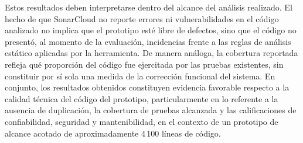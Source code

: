 Estos resultados deben interpretarse dentro del alcance del análisis realizado. El hecho de que SonarCloud no reporte errores ni vulnerabilidades en el código analizado no implica que el prototipo esté libre de defectos, sino que el código no presentó, al momento de la evaluación, incidencias frente a las reglas de análisis estático aplicadas por la herramienta. De manera análoga, la cobertura reportada refleja qué proporción del código fue ejercitada por las pruebas existentes, sin constituir por sí sola una medida de la corrección funcional del sistema. En conjunto, los resultados obtenidos constituyen evidencia favorable respecto a la calidad técnica del código del prototipo, particularmente en lo referente a la ausencia de duplicación, la cobertura de pruebas alcanzada y las calificaciones de confiabilidad, seguridad y mantenibilidad, en el contexto de un prototipo de alcance acotado de aproximadamente 4\,100 líneas de código.

\FloatBarrier
